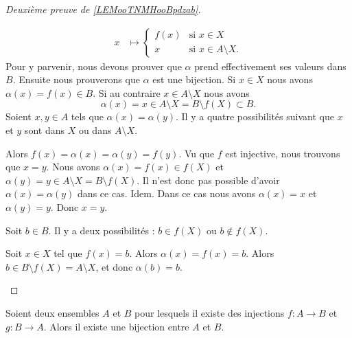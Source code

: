 \begin{proof}[Deuxième preuve de \ref{LEMooTNMHooBpdzab}\cite{BIBooZFPUooIiywbk}]
\begin{subproof}
\begin{equation}
\begin{aligned}
				x              & \mapsto \begin{cases}
					                         f(x) & \text{si } x\in X             \\
					                         x    & \text{si } x\in A\setminus X.
				                         \end{cases}
			\end{aligned}
		\end{equation}
		Pour y parvenir, nous devons prouver que \( \alpha\) prend effectivement ses valeurs dans \( B\). Ensuite nous prouverons que \( \alpha\) est une bijection.
		Si \( x\in X\) nous avons \( \alpha(x)=f(x)\in B\). Si au contraire \( x\in A\setminus X\) nous avons
		\begin{equation}
			\alpha(x)=x\in A\setminus X=B\setminus f(X)\subset B.
		\end{equation}
		Soient \( x,y\in A\) tels que \( \alpha(x)=\alpha(y)\). Il y a quatre possibilités suivant que \( x\) et \( y\) sont dans \( X\) ou dans \( A\setminus X\).
		\begin{enumerate}
			\spitem[\( x\in X\), \( y\in X\)]
			Alors \( f(x)=\alpha(x)=\alpha(y)=f(y)\). Vu que \( f\) est injective, nous trouvons que \( x=y\).
			\spitem[\( x\in X\), \( y\in A\setminus X\)]
			Nous avons \( \alpha(x)=f(x)\in f(X)\) et \( \alpha(y)=y\in A\setminus X=B\setminus f(X)\). Il n'est donc pas possible d'avoir \( \alpha(x)=\alpha(y)\) dans ce cas.
			\spitem[\( x\in A\setminus X\), \( y\in X\)]
			Idem.
			Dans ce cas nous avons \( \alpha(x)=x\) et \( \alpha(y)=y\). Donc \( x=y\).
		\end{enumerate}
		Soit \( b\in B\). Il y a deux possibilités : \( b\in f(X)\) ou \( b\notin f(X)\).
		\begin{subproof}
			\spitem[Si \( b\in f(X)\)]
			Soit \( x\in X\) tel que \( f(x)=b\). Alors \( \alpha(x)=f(x)=b\).
			\spitem[Si \( b\notin f(X)\)]
			Alors \( b\in B\setminus f(X)=A\setminus X\), et donc \( \alpha(b)=b\).
		\end{subproof}
	\end{subproof}
\end{proof}


\begin{theorem}      \label{THOooRYZJooQcjlcl}
	Soient deux ensembles \( A\) et \( B\) pour lesquels il existe des injections \( f\colon A\to B\) et \( g\colon B\to A\). Alors il existe une bijection entre \( A\) et \( B\).
\end{theorem}

